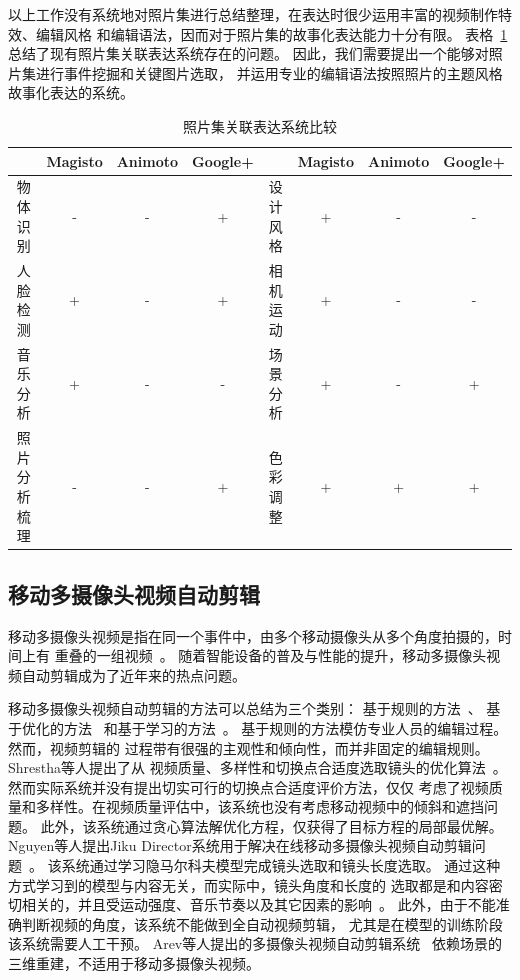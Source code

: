 \documentclass[doctor]{ustcthesis}
\begin{document}
以上工作没有系统地对照片集进行总结整理，在表达时很少运用丰富的视频制作特效、编辑风格
和编辑语法，因而对于照片集的故事化表达能力十分有限。
表格~\ref{tab:monet-comp}总结了现有照片集关联表达系统存在的问题。
因此，我们需要提出一个能够对照片集进行事件挖掘和关键图片选取，
并运用专业的编辑语法按照照片的主题风格故事化表达的系统。

\begin{table}[t]
    \centering
    \caption{照片集关联表达系统比较} \label{tab:monet-comp}
    \small
    \begin{tabular}{|c|c|c|c|c|c|c|c|}
    \hline
     & Magisto  & Animoto &  Google+ & & Magisto  & Animoto &  Google+ \\
    \hline
    物体识别 & - & - & +   & 设计风格 & + & - & -  \\
    人脸检测 & + & - & +  & 相机运动 & + & - & - \\
    音乐分析 & + & - & -   & 场景分析 & + & - & +  \\
    照片分析梳理 & - & - & +  & 色彩调整 & + & + & +  \\
    \hline
\end{tabular}
\end{table}

\subsection{移动多摄像头视频自动剪辑}
移动多摄像头视频是指在同一个事件中，由多个移动摄像头从多个角度拍摄的，时间上有
重叠的一组视频~\cite{DBLP:conf/mm/ShresthaWWBA10}。
随着智能设备的普及与性能的提升，移动多摄像头视频自动剪辑成为了近年来的热点问题。

移动多摄像头视频自动剪辑的方法可以总结为三个类别：
基于规则的方法~\cite{DBLP:books/daglib/0023820}、
基于优化的方法~\cite{DBLP:conf/mm/ShresthaWWBA10}
和基于学习的方法~\cite{DBLP:conf/mm/NguyenSNO13,DBLP:conf/mm/SainiGYO12}。
基于规则的方法模仿专业人员的编辑过程。然而，视频剪辑的
过程带有很强的主观性和倾向性，而并非固定的编辑规则。Shrestha等人提出了从
视频质量、多样性和切换点合适度选取镜头的优化算法~\cite{DBLP:conf/mm/ShresthaWWBA10}。
然而实际系统并没有提出切实可行的切换点合适度评价方法，仅仅
考虑了视频质量和多样性。在视频质量评估中，该系统也没有考虑移动视频中的倾斜和遮挡问题。
此外，该系统通过贪心算法解优化方程，仅获得了目标方程的局部最优解。
Nguyen等人提出Jiku Director系统用于解决在线移动多摄像头视频自动剪辑问题~\cite{DBLP:conf/mm/NguyenSNO13,DBLP:conf/mm/SainiGYO12}。
该系统通过学习隐马尔科夫模型完成镜头选取和镜头长度选取。
通过这种方式学习到的模型与内容无关，而实际中，镜头角度和长度的
选取都是和内容密切相关的，并且受运动强度、音乐节奏以及其它因素的影响~\cite{DBLP:conf/mm/HuaLZ04a}。
此外，由于不能准确判断视频的角度，该系统不能做到全自动视频剪辑，
尤其是在模型的训练阶段该系统需要人工干预。
Arev等人提出的多摄像头视频自动剪辑系统~\cite{Arev:2014:AEF:2601097.2601198}
依赖场景的三维重建，不适用于移动多摄像头视频。
\end{document}

